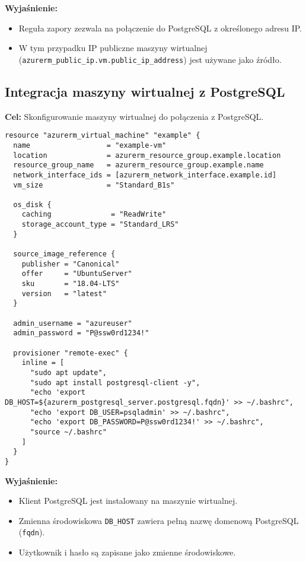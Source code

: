 \documentclass{article}
\begin{document}
\textbf{Wyjaśnienie:}
\begin{itemize}
    \item Reguła zapory zezwala na połączenie do PostgreSQL z określonego adresu IP.
    \item W tym przypadku IP publiczne maszyny wirtualnej (\texttt{azurerm\_public\_ip.vm.public\_ip\_address}) jest używane jako źródło.
\end{itemize}

\subsection{Integracja maszyny wirtualnej z PostgreSQL}
\textbf{Cel:} Skonfigurowanie maszyny wirtualnej do połączenia z PostgreSQL.

\begin{lstlisting}
resource "azurerm_virtual_machine" "example" {
  name                  = "example-vm"
  location              = azurerm_resource_group.example.location
  resource_group_name   = azurerm_resource_group.example.name
  network_interface_ids = [azurerm_network_interface.example.id]
  vm_size               = "Standard_B1s"

  os_disk {
    caching              = "ReadWrite"
    storage_account_type = "Standard_LRS"
  }

  source_image_reference {
    publisher = "Canonical"
    offer     = "UbuntuServer"
    sku       = "18.04-LTS"
    version   = "latest"
  }

  admin_username = "azureuser"
  admin_password = "P@ssw0rd1234!"

  provisioner "remote-exec" {
    inline = [
      "sudo apt update",
      "sudo apt install postgresql-client -y",
      "echo 'export DB_HOST=${azurerm_postgresql_server.postgresql.fqdn}' >> ~/.bashrc",
      "echo 'export DB_USER=psqladmin' >> ~/.bashrc",
      "echo 'export DB_PASSWORD=P@ssw0rd1234!' >> ~/.bashrc",
      "source ~/.bashrc"
    ]
  }
}
\end{lstlisting}

\textbf{Wyjaśnienie:}
\begin{itemize}
    \item Klient PostgreSQL jest instalowany na maszynie wirtualnej.
    \item Zmienna środowiskowa \texttt{DB\_HOST} zawiera pełną nazwę domenową PostgreSQL (\texttt{fqdn}).
    \item Użytkownik i hasło są zapisane jako zmienne środowiskowe.
\end{itemize}
\end{document}
